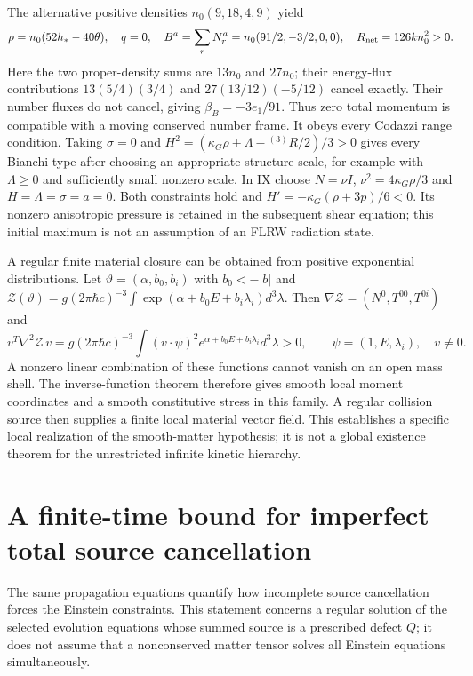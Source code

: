 The alternative positive densities $n_0(9,18,4,9)$ yield
\begin{equation}
 \rho=n_0(52h_*-40\theta),\quad q=0,\quad
 B^a=\sum_rN_r^a=n_0(91/2,-3/2,0,0),\quad
 R_{\rm net}=126kn_0^2>0.
 \label{geo:reacting_zero_flux}
\end{equation}
Here the two proper-density sums are $13n_0$ and $27n_0$; their energy-flux contributions $13(5/4)(3/4)$ and $27(13/12)(-5/12)$ cancel exactly. Their number fluxes do not cancel, giving $\beta_B=-3e_1/91$. Thus zero total momentum is compatible with a moving conserved number frame. It obeys every Codazzi range condition. Taking $\sigma=0$ and
$H^2=(\kappa_G\rho+\Lambda-{}^{(3)}R/2)/3>0$ gives every Bianchi type after choosing an appropriate structure scale, for example with $\Lambda\ge0$ and sufficiently small nonzero scale. In IX choose $N=\nu I$, $\nu^2=4\kappa_G\rho/3$ and $H=\Lambda=\sigma=a=0$. Both constraints hold and $H'=-\kappa_G(\rho+3p)/6<0$. Its nonzero anisotropic pressure is retained in the subsequent shear equation; this initial maximum is not an assumption of an FLRW radiation state.

A regular finite material closure can be obtained from positive exponential distributions. Let
$\vartheta=(\alpha,b_0,b_i)$ with $b_0<-|b|$ and
$\mathcal Z(\vartheta)=g(2\pi\hbar c)^{-3}\int\exp(\alpha+b_0E+b_i\lambda_i)d^3\lambda$.
Then $\nabla\mathcal Z=(N^0,T^{00},T^{0i})$ and
\begin{equation}
 v^T\nabla^2\mathcal Z\,v
 =g(2\pi\hbar c)^{-3}\int(v\cdot\psi)^2
              e^{\alpha+b_0E+b_i\lambda_i}d^3\lambda>0,
 \qquad\psi=(1,E,\lambda_i),\quad v\ne0.
 \label{geo:convex_closure}
\end{equation}
A nonzero linear combination of these functions cannot vanish on an open mass shell. The inverse-function theorem therefore gives smooth local moment coordinates and a smooth constitutive stress in this family. A regular collision source then supplies a finite local material vector field. This establishes a specific local realization of the smooth-matter hypothesis; it is not a global existence theorem for the unrestricted infinite kinetic hierarchy.

\section{A finite-time bound for imperfect total source cancellation}
\label{geo:forced_constraints}

The same propagation equations quantify how incomplete source cancellation forces the Einstein constraints. This statement concerns a regular solution of the selected evolution equations whose summed source is a prescribed defect $Q$; it does not assume that a nonconserved matter tensor solves all Einstein equations simultaneously.

